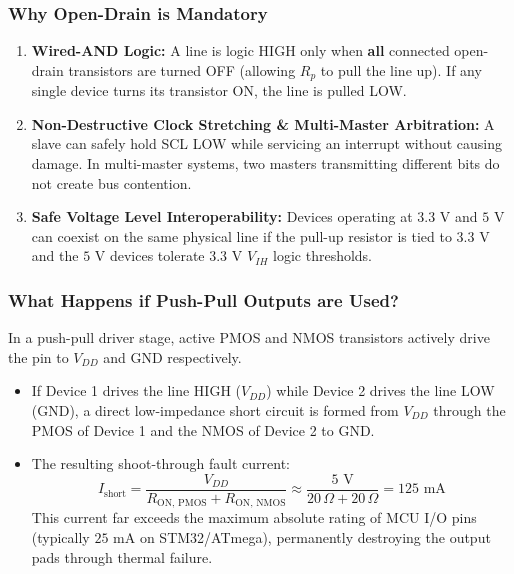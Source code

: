 \documentclass[11pt,a4paper]{article}
\begin{document}
\subsubsection*{Why Open-Drain is Mandatory}
\begin{enumerate}
    \item \textbf{Wired-AND Logic:} A line is logic HIGH only when \textbf{all} connected open-drain transistors are turned OFF (allowing $R_p$ to pull the line up). If any single device turns its transistor ON, the line is pulled LOW.
    \item \textbf{Non-Destructive Clock Stretching \& Multi-Master Arbitration:} A slave can safely hold SCL LOW while servicing an interrupt without causing damage. In multi-master systems, two masters transmitting different bits do not create bus contention.
    \item \textbf{Safe Voltage Level Interoperability:} Devices operating at $3.3\text{ V}$ and $5\text{ V}$ can coexist on the same physical line if the pull-up resistor is tied to $3.3\text{ V}$ and the $5\text{ V}$ devices tolerate $3.3\text{ V}$ $V_{IH}$ logic thresholds.
\end{enumerate}

\subsubsection*{What Happens if Push-Pull Outputs are Used?}
In a push-pull driver stage, active PMOS and NMOS transistors actively drive the pin to $V_{DD}$ and GND respectively.
\begin{itemize}
    \item If Device 1 drives the line HIGH ($V_{DD}$) while Device 2 drives the line LOW (GND), a direct low-impedance short circuit is formed from $V_{DD}$ through the PMOS of Device 1 and the NMOS of Device 2 to GND.
    \item The resulting shoot-through fault current:
    \begin{equation}
    I_{\text{short}} = \frac{V_{DD}}{R_{\text{ON, PMOS}} + R_{\text{ON, NMOS}}} \approx \frac{5\text{ V}}{20\,\Omega + 20\,\Omega} = 125\text{ mA}
    \end{equation}
    This current far exceeds the maximum absolute rating of MCU I/O pins (typically $25\text{ mA}$ on STM32/ATmega), permanently destroying the output pads through thermal failure.
\end{itemize}

\end{document}
